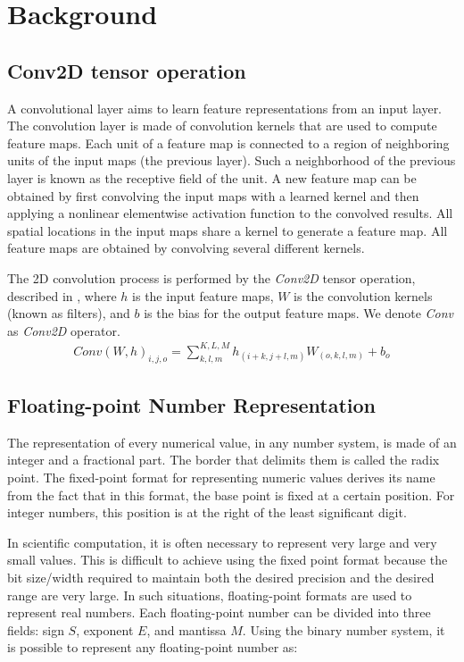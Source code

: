 \section{Background}
\label{sec:background}

\subsection{Conv2D tensor operation}
A convolutional layer aims to learn feature representations from an input layer. The convolution layer is made of convolution kernels that are used to compute feature maps. Each unit of a feature map is connected to a region of neighboring units of the input maps (the previous layer). Such a neighborhood of the previous layer is known as the receptive field of the unit. A new feature map can be obtained by first convolving the input maps with a learned kernel and then applying a nonlinear elementwise activation function to the convolved results. All spatial locations in the input maps share a kernel to generate a feature map. All feature maps are obtained by convolving several different kernels\cite{gu2018recent}.


The 2D convolution process is performed by the \emph{Conv2D} tensor operation, described in , where $h$ is the input feature maps, $W$ is the convolution kernels (known as filters), and $b$ is the bias for the output feature maps\cite{goodfellow2016deep}. We denote \emph{Conv} as \emph{Conv2D} operator.
\begin{eqnarray} \label{eq:conv2D}
Conv\left(W,h\right)_{i,j,o}=\sum_{k,l,m}^{K,L,M} h_{(i+k,j+l,m)} W_{(o,k,l,m)}+b_{o}
\end{eqnarray}

\subsection{Floating-point Number Representation}
The representation of every numerical value, in any number system, is made of an integer and a fractional part. The border that delimits them is called the radix point. The fixed-point format for representing numeric values derives its name from the fact that in this format, the base point is fixed at a certain position. For integer numbers, this position is at the right of the least significant digit.

In scientific computation, it is often necessary to represent very large and very small values. This is difficult to achieve using the fixed point format because the bit size/width required to maintain both the desired precision and the desired range are very large. In such situations, floating-point formats are used to represent real numbers. Each floating-point number can be divided into three fields: sign $S$, exponent $E$, and mantissa $M$. Using the binary number system, it is possible to represent any floating-point number as:

